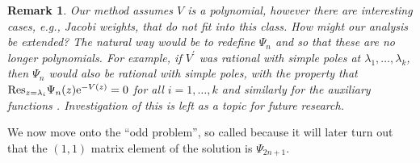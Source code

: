 \documentclass[pdftex]{sigma}
\numberwithin{equation}{section}
\newtheorem{Remark}[Theorem]{Remark}
\begin{document}
\begin{Remark} Our method assumes $V$ is a polynomial, however there are interesting cases, e.g., Jacobi weights, that do not fit into this class. How might our analysis be extended? The natural way would be to redefine $\Psi_n$ and  so that these are no longer polynomials. For example, if $V^\prime$ was rational with simple poles at $\lambda_1, \dots, \lambda_k$, then $\Psi_n$ would also be rational with simple poles, with the property that $\mathrm{Res}_{z = \lambda_i} \Psi_{n}(z) {\rm e}^{-V(z)} = 0$ for all $i=1,\dots, k$ and similarly for the auxiliary functions . Investigation of this is left as a topic for future research.
\end{Remark}
We now move onto the \enquote{odd problem}, so called because it will later turn out that the $(1,1)$ matrix element of the solution is $\Psi_{2n+1}$.
\end{document}
